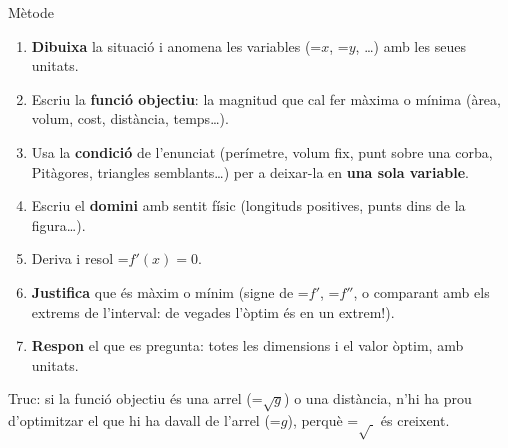 \documentclass[11pt,a4paper]{article}
\newcommand{\fmm}[1]{\setbox0=\hbox{$#1$}\ifdim\wd0>\linewidth\fmdisp{#1}\else\mbox{\box0}\fi}
\newcommand{\fmdisp}[1]{\[\setbox2=\hbox{$\displaystyle #1$}\ifdim\wd2>\linewidth\resizebox{\linewidth}{!}{\box2}\else\box2\fi\]}
\begin{document}
\begin{fmdef}{Mètode}
\begin{enumerate}
\item \textbf{Dibuixa} la situació i anomena les variables (\fmm{x}, \fmm{y}, \dots{}) amb les seues unitats.
\item Escriu la \textbf{funció objectiu}: la magnitud que cal fer màxima o mínima (àrea, volum, cost, distància, temps\dots{}).
\item Usa la \textbf{condició} de l'enunciat (perímetre, volum fix, punt sobre una corba, Pitàgores, triangles semblants\dots{}) per a deixar-la en \textbf{una sola variable}.
\item Escriu el \textbf{domini} amb sentit físic (longituds positives, punts dins de la figura\dots{}).
\item Deriva i resol \fmm{f'(x)=0}.
\item \textbf{Justifica} que és màxim o mínim (signe de \fmm{f'}, \fmm{f''}, o comparant amb els extrems de l'interval: de vegades l'òptim és en un extrem!).
\item \textbf{Respon} el que es pregunta: totes les dimensions i el valor òptim, amb unitats.
\end{enumerate}

\begin{center}\colorbox{fmyellow!45}{\parbox{0.9\linewidth}{\centering\strut Truc: si la funció objectiu és una arrel (\fmm{\sqrt{g}}) o una distància, n'hi ha prou d'optimitzar el que hi ha davall de l'arrel (\fmm{g}), perquè \fmm{\sqrt{\ }} és creixent.\strut}}\end{center}
\end{fmdef}
\end{document}
